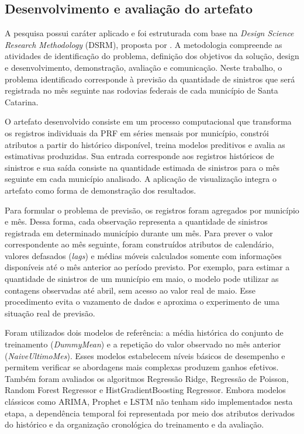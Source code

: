\documentclass[12pt]{article}
\begin{document}
\subsection{Desenvolvimento e avaliação do artefato}

A pesquisa possui caráter aplicado e foi estruturada com base na \textit{Design Science Research Methodology} (DSRM), proposta por \cite{peffers2007dsrm}. A metodologia compreende as atividades de identificação do problema, definição dos objetivos da solução, design e desenvolvimento, demonstração, avaliação e comunicação. Neste trabalho, o problema identificado corresponde à previsão da quantidade de sinistros que será registrada no mês seguinte nas rodovias federais de cada município de Santa Catarina.

O artefato desenvolvido consiste em um processo computacional que transforma os registros individuais da PRF em séries mensais por município, constrói atributos a partir do histórico disponível, treina modelos preditivos e avalia as estimativas produzidas. Sua entrada corresponde aos registros históricos de sinistros e sua saída consiste na quantidade estimada de sinistros para o mês seguinte em cada município analisado. A aplicação de visualização integra o artefato como forma de demonstração dos resultados.

Para formular o problema de previsão, os registros foram agregados por município e mês. Dessa forma, cada observação representa a quantidade de sinistros registrada em determinado município durante um mês. Para prever o valor correspondente ao mês seguinte, foram construídos atributos de calendário, valores defasados (\textit{lags}) e médias móveis calculados somente com informações disponíveis até o mês anterior ao período previsto. Por exemplo, para estimar a quantidade de sinistros de um município em maio, o modelo pode utilizar as contagens observadas até abril, sem acesso ao valor real de maio. Esse procedimento evita o vazamento de dados e aproxima o experimento de uma situação real de previsão.

Foram utilizados dois modelos de referência: a média histórica do conjunto de treinamento (\textit{DummyMean}) e a repetição do valor observado no mês anterior (\textit{NaiveUltimoMes}). Esses modelos estabelecem níveis básicos de desempenho e permitem verificar se abordagens mais complexas produzem ganhos efetivos. Também foram avaliados os algoritmos Regressão Ridge, Regressão de Poisson, Random Forest Regressor e HistGradientBoosting Regressor. Embora modelos clássicos como ARIMA, Prophet e LSTM não tenham sido implementados nesta etapa, a dependência temporal foi representada por meio dos atributos derivados do histórico e da organização cronológica do treinamento e da avaliação.
\end{document}
